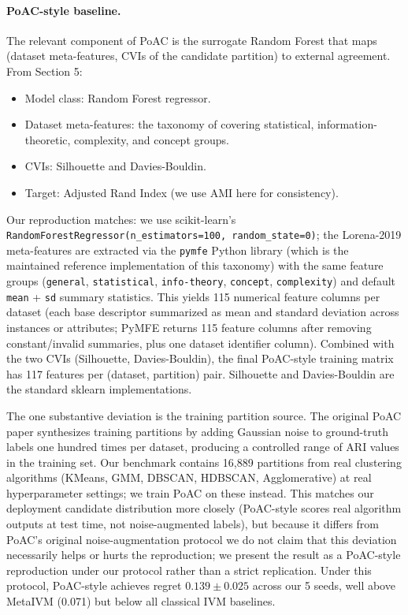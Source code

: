 \documentclass[10pt]{article} %
\begin{document}
\paragraph{PoAC-style baseline.} The relevant component of PoAC is the surrogate Random Forest that maps (dataset meta-features, CVIs of the candidate partition) to external agreement. From \citet{dasilva2024poac} Section 5:
\begin{itemize}
    \item Model class: Random Forest regressor.
    \item Dataset meta-features: the taxonomy of \citet{lorena2019complexity} covering statistical, information-theoretic, complexity, and concept groups.
    \item CVIs: Silhouette and Davies-Bouldin.
    \item Target: Adjusted Rand Index (we use AMI here for consistency).
\end{itemize}
Our reproduction matches: we use scikit-learn's \texttt{RandomForestRegressor(n\_estimators=100, random\_state=0)}; the Lorena-2019 meta-features are extracted via the \texttt{pymfe} Python library (which is the maintained reference implementation of this taxonomy) with the same feature groups (\texttt{general}, \texttt{statistical}, \texttt{info-theory}, \texttt{concept}, \texttt{complexity}) and default \texttt{mean} + \texttt{sd} summary statistics. This yields 115 numerical feature columns per dataset (each base descriptor summarized as mean and standard deviation across instances or attributes; PyMFE returns 115 feature columns after removing constant/invalid summaries, plus one dataset identifier column). Combined with the two CVIs (Silhouette, Davies-Bouldin), the final PoAC-style training matrix has 117 features per (dataset, partition) pair. Silhouette and Davies-Bouldin are the standard sklearn implementations.

The one substantive deviation is the training partition source. The original PoAC paper synthesizes training partitions by adding Gaussian noise to ground-truth labels one hundred times per dataset, producing a controlled range of ARI values in the training set. Our benchmark contains 16,889 partitions from real clustering algorithms (KMeans, GMM, DBSCAN, HDBSCAN, Agglomerative) at real hyperparameter settings; we train PoAC on these instead. This matches our deployment candidate distribution more closely (PoAC-style scores real algorithm outputs at test time, not noise-augmented labels), but because it differs from PoAC's original noise-augmentation protocol we do not claim that this deviation necessarily helps or hurts the reproduction; we present the result as a PoAC-style reproduction under our protocol rather than a strict replication. Under this protocol, PoAC-style achieves regret $0.139 \pm 0.025$ across our 5 seeds, well above MetaIVM (0.071) but below all classical IVM baselines.
\end{document}
